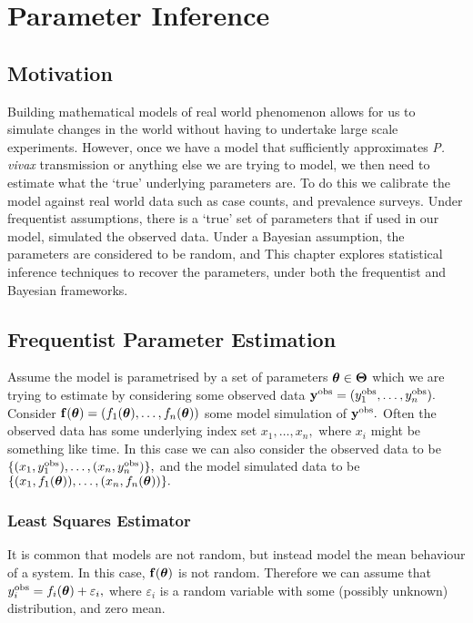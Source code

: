 \chapter{Parameter Inference}

\section{Motivation}

Building mathematical models of real world phenomenon allows for us to
simulate changes in the world without having to undertake large scale
experiments. However, once we have a model that sufficiently approximates
\emph{P. vivax} transmission
or anything else we are trying to model,
we then need to estimate what the `true' underlying parameters are.
To do this we calibrate the model against real world data such as case counts,
and prevalence surveys. Under frequentist assumptions, there is a `true' set of
parameters that if used in our model, simulated the observed data. Under a Bayesian
assumption, the parameters are considered to be random, and
This chapter explores statistical inference techniques to recover the
parameters, under both the frequentist and Bayesian frameworks.

\section{Frequentist Parameter Estimation}

Assume the model is parametrised by a set of parameters
$\bm{\theta} \in \mathbf{\Theta}$ which
we are trying to estimate by considering some observed data
$\mathbf{y}^{\mathrm{obs}} = (y_1^{\mathrm{obs}}, \dots, y_n^{\mathrm{obs}}).$
Consider $\mathbf{f}(\bm{\theta}) = (f_1(\bm{\theta}), \dots, f_n(\bm{\theta}))$
some model simulation of
$\mathbf{y}^{\mathrm{obs}}.$ Often the observed data has some underlying index set
$x_1, \dots, x_n,$ where $x_i$ might be something like time. In this case
we can also consider the observed data to be
$\{(x_1, y_1^{\mathrm{obs}}), \dots, (x_n, y_n^{\mathrm{obs}})\},$ and the
model simulated data to be
$\{(x_1, f_1(\bm{\theta})), \dots, (x_n, f_n(\bm{\theta}))\}.$

\subsection*{Least Squares Estimator}

It is common that models are not random, but instead model the mean behaviour
of a system. In this case, $\mathbf{f}(\bm{\theta})$ is not random. Therefore
we can assume that $y^{\mathrm{obs}}_i = f_i(\bm{\theta}) + \varepsilon_i,$
where $\varepsilon_i$ is a random variable with some (possibly unknown)
distribution, and zero mean.

